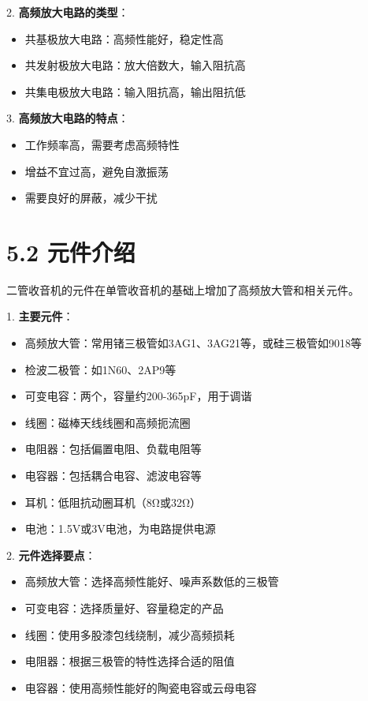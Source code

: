 \documentclass[12pt,UTF8]{ctexbook}
\begin{document}
2. \textbf{高频放大电路的类型}：
   \begin{itemize}[leftmargin=3.5em]
   \item 共基极放大电路：高频性能好，稳定性高
   \item 共发射极放大电路：放大倍数大，输入阻抗高
   \item 共集电极放大电路：输入阻抗高，输出阻抗低
   \end{itemize}

3. \textbf{高频放大电路的特点}：
   \begin{itemize}[leftmargin=3.5em]
   \item 工作频率高，需要考虑高频特性
   \item 增益不宜过高，避免自激振荡
   \item 需要良好的屏蔽，减少干扰
   \end{itemize}

\section*{5.2 元件介绍}

二管收音机的元件在单管收音机的基础上增加了高频放大管和相关元件。

1. \textbf{主要元件}：
   \begin{itemize}[leftmargin=3.5em]
   \item 高频放大管：常用锗三极管如3AG1、3AG21等，或硅三极管如9018等
   \item 检波二极管：如1N60、2AP9等
   \item 可变电容：两个，容量约200-365pF，用于调谐
   \item 线圈：磁棒天线线圈和高频扼流圈
   \item 电阻器：包括偏置电阻、负载电阻等
   \item 电容器：包括耦合电容、滤波电容等
   \item 耳机：低阻抗动圈耳机（8Ω或32Ω）
   \item 电池：1.5V或3V电池，为电路提供电源
   \end{itemize}

2. \textbf{元件选择要点}：
   \begin{itemize}[leftmargin=3.5em]
   \item 高频放大管：选择高频性能好、噪声系数低的三极管
   \item 可变电容：选择质量好、容量稳定的产品
   \item 线圈：使用多股漆包线绕制，减少高频损耗
   \item 电阻器：根据三极管的特性选择合适的阻值
   \item 电容器：使用高频性能好的陶瓷电容或云母电容
   \end{itemize}
\end{document}
